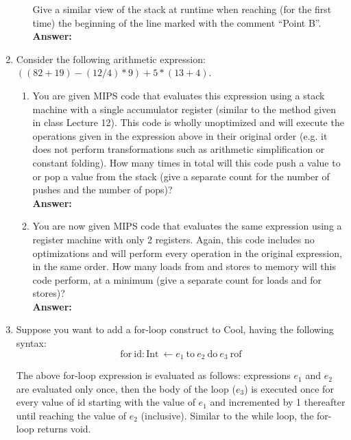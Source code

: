 \documentclass[11pt]{article}
\begin{document}
\begin{enumerate}
\begin{enumerate}
    Give a similar view of the stack at runtime when reaching (for the first time) the beginning of the line marked with the comment ``Point B''.\\
    \textbf{Answer:} 
    
   \newpage
  \end{enumerate}
  
  \item  Consider the following arithmetic expression: $((82+19)-(12/4)*9)+5*(13+4)$.
  
  \begin{enumerate}
    \item You are given MIPS code that evaluates this expression using a stack machine with a single accumulator register (similar to the method given in class Lecture 12). This code is wholly unoptimized and will execute the operations given in the expression above in their original order (e.g. it does not perform transformations such as arithmetic simplification or constant folding). How many times in total will this code push a value to or pop a value from the stack (give a separate count for the number of pushes and the number of pops)?\\
    \textbf{Answer:} 
    
   \newpage
    \item  You are now given MIPS code that evaluates the same expression using a register machine with only 2 registers. Again, this code includes no optimizations and will perform every operation in the original expression, in the same order. How many loads from and stores to memory will this code perform, at a minimum (give a separate count for loads and for stores)?\\
    \textbf{Answer:} 
    
   \newpage
  \end{enumerate}
    
  \item  Suppose you want to add a for-loop construct to Cool, having the following syntax:\\
  
  $$\mbox{for}\ \mbox{id}: \mbox{Int}\ \leftarrow e_1\ \mbox{to}\ e_2\ \mbox{do}\ e_3\ \mbox{rof}$$ 
  
  The above for-loop expression is evaluated as follows: expressions $e_1$ and $e_2$ are evaluated only once, then the body of the loop ($e_3$) is executed once for every value of $\mbox{id}$ starting with the value of $e_1$ and incremented by 1 thereafter until reaching the value of $e_2$ (inclusive). Similar to the while loop, the for-loop returns void.
  

\end{enumerate}
\end{document}
